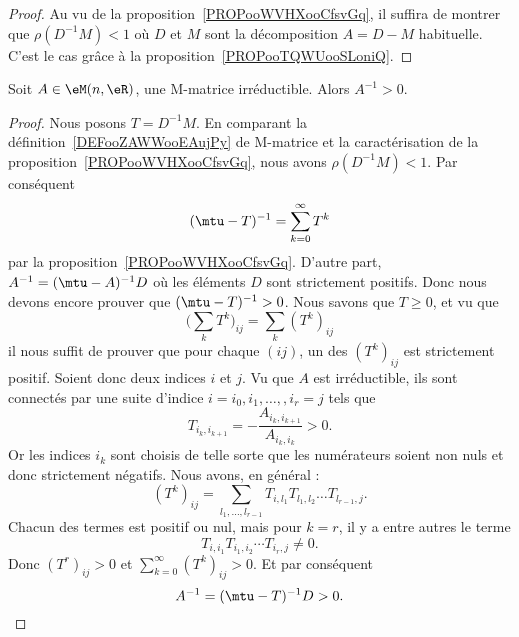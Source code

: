 \begin{proof}
	Au vu de la proposition~\ref{PROPooWVHXooCfsvGq}, il suffira de montrer que \( \rho(D^{-1}M)<1\) où \( D\) et \( M\) sont la décomposition \( A=D-M\) habituelle. C'est le cas grâce à la proposition~\ref{PROPooTQWUooSLoniQ}.
\end{proof}

\begin{proposition}     \label{PROPooZDMQooIZAbKK}
	Soit \( A\in \eM(n,\eR)\), une M-matrice irréductible. Alors \( A^{-1}>0\).
\end{proposition}

\begin{proof}
	Nous posons \( T=D^{-1}M\). En comparant la définition~\ref{DEFooZAWWooEAujPy} de M-matrice et la caractérisation de la proposition~\ref{PROPooWVHXooCfsvGq}, nous avons \( \rho(D^{-1}M)<1\). Par conséquent
	\begin{equation}
		(\mtu-T)^{-1}=\sum_{k=0}^{\infty}T^k
	\end{equation}
	par la proposition~\ref{PROPooWVHXooCfsvGq}. D'autre part, \( A^{-1}=(\mtu-A)^{-1}D\) où les éléments \( D\) sont strictement positifs. Donc nous devons encore prouver que \( (\mtu-T)^{-1}>0\). Nous savons que \( T\geq 0\), et vu que
	\begin{equation}
		\big(\sum_kT^k)_{ij}=\sum_k(T^k)_{ij}
	\end{equation}
	il nous suffit de prouver que pour chaque \( (ij)\), un des \( (T^k)_{ij}\) est strictement positif. Soient donc deux indices \( i\) et \( j\). Vu que \( A\) est irréductible, ils sont connectés par une suite d'indice $i=i_0,i_1,\ldots, ,i_r=j$ tels que
	\begin{equation}
		T_{i_k,i_{k+1}}=-\frac{ A_{i_k,i_{k+1}} }{ A_{i_k,i_k} }>0.
	\end{equation}
	Or les indices \( i_k\) sont choisis de telle sorte que les numérateurs soient non nuls et donc strictement négatifs. Nous avons, en général :
	\begin{equation}
		(T^k)_{ij}=\sum_{l_1,\ldots, l_{r-1}}T_{i,l_1}T_{l_1,l_2}\ldots T_{l_{r-1},j}.
	\end{equation}
	Chacun des termes est positif ou nul, mais pour \( k=r\), il y a entre autres le terme
	\begin{equation}
		T_{i,i_1}T_{i_1,i_2}\cdots T_{i_r,j}\neq 0.
	\end{equation}
	Donc \( (T^r)_{ij}>0\) et \( \sum_{k=0}^{\infty}(T^k)_{ij}>0\). Et par conséquent
	\begin{equation}
		A^{-1}=(\mtu-T)^{-1}D>0.
	\end{equation}
\end{proof}

